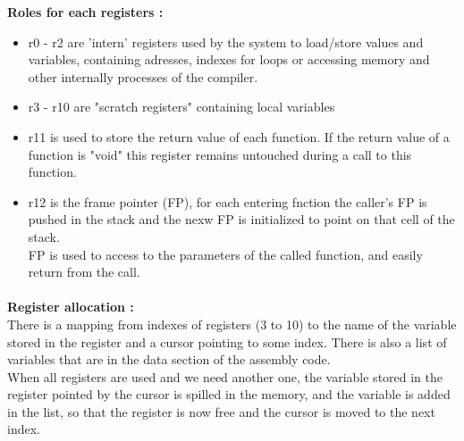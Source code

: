 \documentclass[a4paper,10pt]{article}
\begin{document}
	\textbf{Roles for each registers :}
    \begin{itemize}
    	\item r0 - r2 are 'intern' registers used by the system to load/store values and variables, containing adresses, indexes for loops or accessing memory and other internally processes of the compiler.

 		\item r3 - r10 are "scratch registers" containing local variables

 		\item r11 is used to store the return value of each function. If the return value of a function is "void" this register remains untouched during a call to this 
 	function.

 		\item r12 is the frame pointer (FP), for each entering fnction the caller's FP is pushed in the stack and the nexw FP is initialized to point on that cell of the
 	stack. \\
 	FP is used to access to the parameters of the called function, and easily return from the call.

	\end{itemize}
    
    \paragraph{}
	\textbf{Register allocation : } \\
There is a mapping from indexes of registers (3 to 10) to the name of the variable stored in the register and a cursor pointing to some index. There is also a list of variables that are in the data section of the assembly code. \\
When all registers are used and we need another one, the variable stored in the register pointed by the cursor is spilled in the memory, and the variable is added in the list, so that the register is now free and the cursor is moved to the next index.
\end{document}
